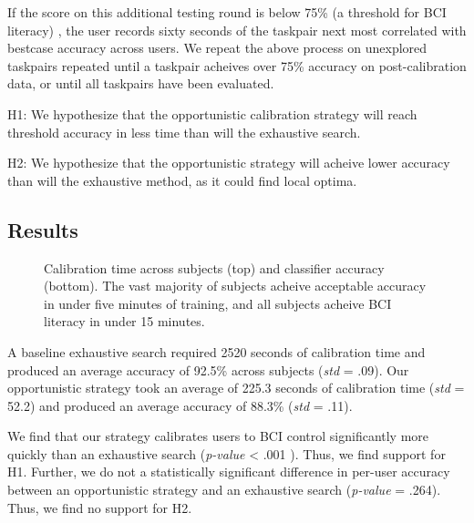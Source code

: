 If the score on this additional testing round is below 75\% (a threshold for BCI literacy) \cite{vidaurre_towards_2010}, the user records sixty seconds of the taskpair next most correlated with bestcase accuracy across users. We repeat the above process on unexplored taskpairs repeated until a taskpair acheives over 75\% accuracy on post-calibration data, or until all taskpairs have been evaluated.

H1: We hypothesize that the opportunistic calibration strategy will reach threshold accuracy in less  time than will the exhaustive search.

H2: We hypothesize that the opportunistic strategy will acheive lower accuracy than will the exhaustive method, as it could find local optima.

\subsection{Results}

\begin{figure}[!h]
  \vspace{-0.2cm}
  \centering
   {}
  \caption{Calibration time across subjects (top) and classifier accuracy (bottom). The vast majority of subjects acheive acceptable accuracy in under five minutes of training, and all subjects acheive BCI literacy in under 15 minutes. }
  \label{fig:fig2}
  \vspace{-0.1cm}
\end{figure}

A baseline exhaustive search required 2520 seconds of calibration time and produced an average accuracy of 92.5\% across subjects (\textit{std} = .09). Our opportunistic strategy took an average of 225.3 seconds of calibration time (\textit{std} = 52.2) and produced an average accuracy of 88.3\% (\textit{std} = .11).

We find that our strategy calibrates users to BCI control significantly more quickly than an exhaustive search (\textit{p-value} < .001 ). Thus, we find support for H1. Further, we do not a statistically significant difference in per-user accuracy between an opportunistic strategy and an exhaustive search (\textit{p-value} = .264). Thus, we find no support for H2.

